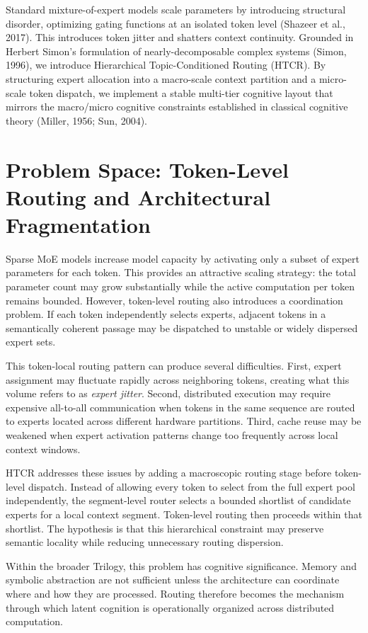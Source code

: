 Standard mixture-of-expert models scale parameters by introducing structural disorder, optimizing gating functions at an isolated token level (Shazeer et al., 2017). This introduces token jitter and shatters context continuity. Grounded in Herbert Simon’s formulation of nearly-decomposable complex systems (Simon, 1996), we introduce Hierarchical Topic-Conditioned Routing (HTCR). By structuring expert allocation into a macro-scale context partition and a micro-scale token dispatch, we implement a stable multi-tier cognitive layout that mirrors the macro/micro cognitive constraints established in classical cognitive theory (Miller, 1956; Sun, 2004).

\section{Problem Space: Token-Level Routing and Architectural Fragmentation}

Sparse MoE models increase model capacity by activating only a subset of expert parameters for each token. This provides an attractive scaling strategy: the total parameter count may grow substantially while the active computation per token remains bounded. However, token-level routing also introduces a coordination problem. If each token independently selects experts, adjacent tokens in a semantically coherent passage may be dispatched to unstable or widely dispersed expert sets.

This token-local routing pattern can produce several difficulties. First, expert assignment may fluctuate rapidly across neighboring tokens, creating what this volume refers to as \textit{expert jitter}. Second, distributed execution may require expensive all-to-all communication when tokens in the same sequence are routed to experts located across different hardware partitions. Third, cache reuse may be weakened when expert activation patterns change too frequently across local context windows.

HTCR addresses these issues by adding a macroscopic routing stage before token-level dispatch. Instead of allowing every token to select from the full expert pool independently, the segment-level router selects a bounded shortlist of candidate experts for a local context segment. Token-level routing then proceeds within that shortlist. The hypothesis is that this hierarchical constraint may preserve semantic locality while reducing unnecessary routing dispersion.

Within the broader Trilogy, this problem has cognitive significance. Memory and symbolic abstraction are not sufficient unless the architecture can coordinate where and how they are processed. Routing therefore becomes the mechanism through which latent cognition is operationally organized across distributed computation.

